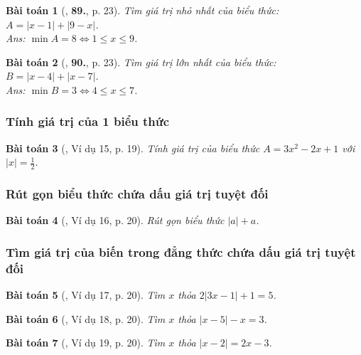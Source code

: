 \documentclass{article}
\numberwithin{equation}{section}
\newtheorem{baitoan}{Bài toán}
\begin{document}
\begin{baitoan}[\cite{Tuyen_Toan_7}, \textbf{89.}, p. 23]
	Tìm giá trị nhỏ nhất của biểu thức: $A = |x - 1| + |9 - x|$.\\\mbox{}\hfill\textsf{Ans:} $\min A = 8\Leftrightarrow 1\le x\le 9$.
\end{baitoan}

\begin{baitoan}[\cite{Tuyen_Toan_7}, \textbf{90.}, p. 23]
	Tìm giá trị lớn nhất của biểu thức: $B = |x - 4| + |x - 7|$.\\\mbox{}\hfill\textsf{Ans:} $\min B = 3\Leftrightarrow 4\le x\le 7$.
\end{baitoan}

\subsubsection{Tính giá trị của 1 biểu thức}

\begin{baitoan}[\cite{Binh_Toan_7_tap_1}, Ví dụ 15, p. 19]
	Tính giá trị của biểu thức $A = 3x^2 - 2x + 1$ với $|x| = \frac{1}{2}$.
\end{baitoan}

\subsubsection{Rút gọn biểu thức chứa dấu giá trị tuyệt đối}

\begin{baitoan}[\cite{Binh_Toan_7_tap_1}, Ví dụ 16, p. 20]
	Rút gọn biểu thức $|a| + a$.
\end{baitoan}

\subsubsection{Tìm giá trị của biến trong đẳng thức chứa dấu giá trị tuyệt đối}

\begin{baitoan}[\cite{Binh_Toan_7_tap_1}, Ví dụ 17, p. 20]
	Tìm $x$ thỏa $2|3x - 1| + 1 = 5$.
\end{baitoan}

\begin{baitoan}[\cite{Binh_Toan_7_tap_1}, Ví dụ 18, p. 20]
	Tìm $x$ thỏa $|x - 5| - x = 3$.
\end{baitoan}

\begin{baitoan}[\cite{Binh_Toan_7_tap_1}, Ví dụ 19, p. 20]
	Tìm $x$ thỏa $|x - 2| = 2x - 3$.
\end{baitoan}
\end{document}
